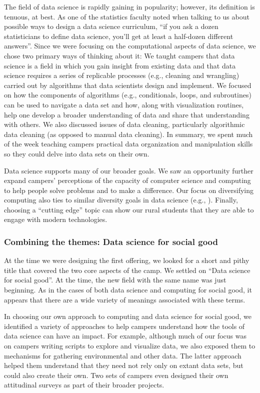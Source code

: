 The field of data science is rapidly gaining in popularity; however,
its definition is tenuous, at best.  As one of the statistics faculty
noted when talking to us about possible ways to design a data science
curriculum, ``if you ask a dozen statisticians to define data
science, you'll get at least a half-dozen different answers''.
Since we were focusing on the computational aspects of data science,
we chose two primary ways of thinking about it: We taught campers
that data science is a field in which you gain insight from existing
data and that data science requires a series of replicable processes
(e.g., cleaning and wrangling) carried out by algorithms that data
scientists design and implement.  We focused on how the components
of algorithms (e.g., conditionals,  loops, and subroutines) can be
used to navigate a data set and how, along with visualization
routines, help one develop a broader understanding of data and share
that understanding with others.  We also discussed issues of data
cleaning, particularly algorithmic data cleaning (as opposed to
manual data cleaning).  In summary, we spent much of the week
teaching campers practical data organization and manipulation skills
so they could delve into data sets on their own.

Data science supports many of our broader goals.  We saw an opportunity
further expand campers' perceptions of the capacity of computer
science and computing to help people solve problems and to make a
difference.  Our focus on diversifying computing also ties to similar
diversity goals in data science (e.g., \cite{Berman2015}).  Finally,
choosing a ``cutting edge'' topic can show our rural students that
they are able to engage with modern technologies.

\subsubsection{Combining the themes: Data science for social good}

At the time we were designing the first offering, we looked
for a short and pithy title that covered the two core aspects of the camp.
We settled on ``Data science for social good''.  At the time, the
new field with the same name was just beginning.  As in the cases of
both data science and computing for social good, it appears that there
are a wide variety of meanings associated with these terms.

In choosing our own approach to computing and data science for
social good, we identified a variety of approaches to help campers
understand how the tools of data science can have an impact.  For
example, although much of our focus was on campers writing scripts
to explore and visualize data, we also exposed them to mechanisms
for gathering environmental and other data.  The latter approach
helped them understand that they need not rely only on extant data
sets, but could also create their own.  Two sets of campers even
designed their own attitudinal surveys as part of their broader
projects.

